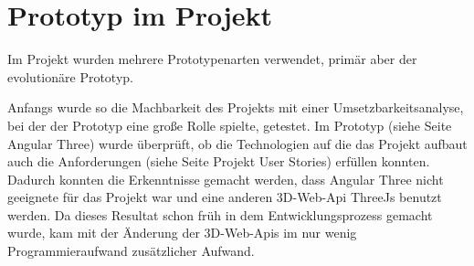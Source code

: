 \section{Prototyp im Projekt}
Im Projekt wurden mehrere Prototypenarten verwendet, primär aber der evolutionäre Prototyp.

Anfangs wurde so die Machbarkeit des Projekts mit einer Umsetzbarkeitsanalyse, bei der der Prototyp eine große Rolle spielte, getestet. Im Prototyp (siehe Seite \pageref{ch:Technologien:AngularThree} Angular Three) wurde überprüft, ob die Technologien auf die das Projekt aufbaut auch die Anforderungen (siehe Seite \pageref{ch:umsetzung:projekt-user-stories} Projekt User Stories) erfüllen konnten. Dadurch konnten die Erkenntnisse gemacht werden, dass Angular Three nicht geeignete für das Projekt war und eine anderen 3D-Web-Api ThreeJs benutzt werden. Da dieses Resultat schon früh in dem Entwicklungsprozess gemacht wurde, kam mit der Änderung der 3D-Web-Apis im nur wenig Programmieraufwand zusätzlicher Aufwand.
